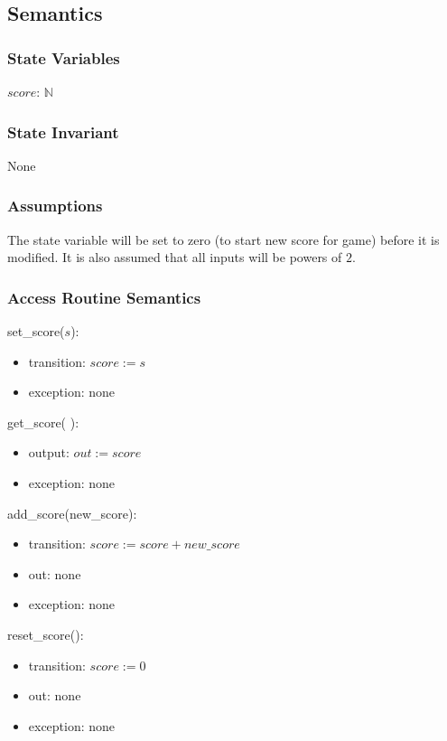 \documentclass[12pt]{article}
\begin{document}
\subsection* {Semantics}

\subsubsection* {State Variables}

$\mathit{score}$: $\mathbb{N}$

\subsubsection* {State Invariant}

None

\subsubsection* {Assumptions}

The state variable will be set to zero (to start new score for game) before it is modified. It is also assumed that all inputs will be powers of $2$.

\subsubsection* {Access Routine Semantics}

\noindent set\_score($\mathit{s}$):
\begin{itemize}
\item transition: $\mathit{score} := \mathit{s}$
\item exception: none
\end{itemize}

\noindent get\_score( ):
\begin{itemize}
\item output: $out := \mathit{score}$
\item exception: none
\end{itemize}

\noindent add\_score(new_score):
\begin{itemize}
\item transition: $\mathit{score} := \mathit{score + new\_score}$
\item out: none
\item exception: none
\end{itemize}

\noindent reset\_score():
\begin{itemize}
\item transition: $\mathit{score} := 0$
\item out: none
\item exception: none
\end{itemize}
\end{document}
